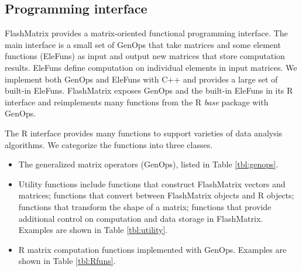 \subsection{Programming interface}

FlashMatrix provides a matrix-oriented functional programming interface.
The main interface is a small set of GenOps that take matrices and some
element functions (EleFuns) as input and output new matrices that store
computation results. EleFuns define computation on individual elements
in input matrices. We implement both GenOps and EleFuns with C++ and provides
a large set of built-in EleFuns. FlashMatrix
exposes GenOps and the built-in EleFuns in its R interface
and reimplements many functions from the R \textit{base} package with GenOps.

The R interface provides many functions to support varieties of data analysis
algorithms. We categorize the functions into three classes.
\begin{itemize}
	\item The generalized matrix operators (GenOps), listed in Table
		\ref{tbl:genops}.
	\item Utility functions include functions that construct FlashMatrix vectors
		and matrices; functions that convert between FlashMatrix objects and R
		objects; functions that transform the shape of a matrix; functions that
		provide additional control on computation and data storage in FlashMatrix.
		Examples are shown in Table \ref{tbl:utility}.
	\item R matrix computation functions implemented with GenOps. Examples
		are shown in Table \ref{tbl:Rfuns}.
\end{itemize}

